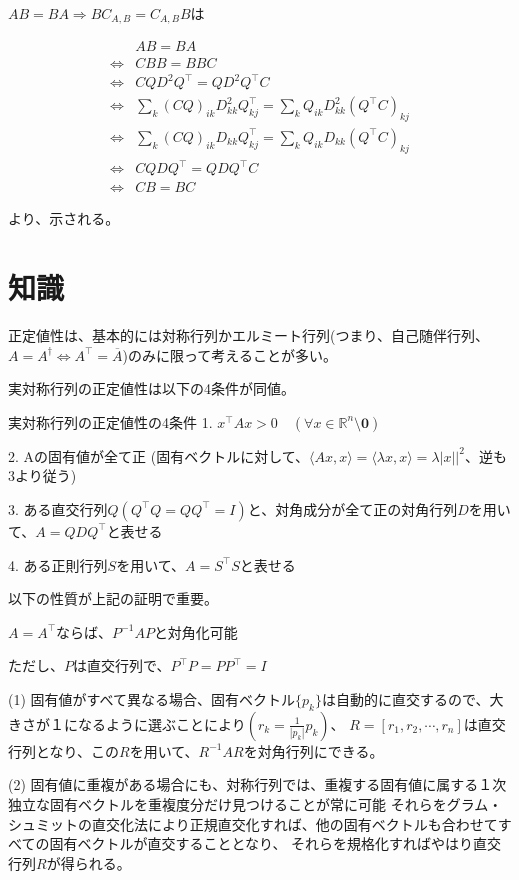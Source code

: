 \documentclass[a4paper, 10pt, dvipdfmx]{jlreq}
\begin{document}
$AB=BA \Rightarrow BC_{A,B}=C_{A,B}B$は

\begin{align*}
                  & AB=BA                                                                     \\
  \Leftrightarrow & CBB=BBC                                                                   \\
  \Leftrightarrow & CQD^2Q^\top =QD^2Q^\top C                                                 \\
  \Leftrightarrow & \sum_k (CQ)_{ik}D^2_{kk}Q^\top _{kj}=\sum_k Q_{ik}D^2_{kk}(Q^\top C)_{kj} \\
  \Leftrightarrow & \sum_k (CQ)_{ik}D_{kk}Q^\top _{kj}=\sum_k Q_{ik}D_{kk}(Q^\top C)_{kj}     \\
  \Leftrightarrow & CQDQ^\top =QDQ^\top C                                                     \\
  \Leftrightarrow & CB=BC
\end{align*}

より、示される。

\section{知識}

正定値性は、基本的には対称行列かエルミート行列(つまり、自己随伴行列、$A=A^{\dagger} \Leftrightarrow A^\top =\overline{A}$)のみに限って考えることが多い。

実対称行列の正定値性は以下の4条件が同値。

\begin{itembox}[l]{実対称行列の正定値性の4条件}
  1. $x^\top Ax>0 \quad (\forall x\in \mathbb{R}^n\setminus {\boldsymbol{0}})$

  2. Aの固有値が全て正 (固有ベクトルに対して、$\langle Ax,x \rangle = \langle \lambda x,x \rangle =\lambda |x||^2$、逆も3より従う)

  3. ある直交行列$Q(Q^\top Q=QQ^\top =I)$と、対角成分が全て正の対角行列$D$を用いて、$A=QDQ^\top $と表せる

  4. ある正則行列$S$を用いて、$A=S^\top S$と表せる
\end{itembox}


以下の性質が上記の証明で重要。

\begin{itembox}[l]{$A=A^\top $ならば、$P^{-1}AP$と対角化可能}

  ただし、$P$は直交行列で、$P^\top P=PP^\top =I$

  (1) 固有値がすべて異なる場合、固有ベクトル$\{p_k\}$は自動的に直交するので、大きさが１になるように選ぶことにより$(r_k=\frac{1}{|p_k|}p_k)$、
  $R=[r_1, r_2, \cdots, r_n]$は直交行列となり、この$R$を用いて、$R^{-1}AR$を対角行列にできる。

  (2) 固有値に重複がある場合にも、対称行列では、重複する固有値に属する１次独立な固有ベクトルを重複度分だけ見つけることが常に可能
  それらをグラム・シュミットの直交化法により正規直交化すれば、他の固有ベクトルも合わせてすべての固有ベクトルが直交することとなり、 それらを規格化すればやはり直交行列$R$が得られる。
\end{itembox}
\end{document}
